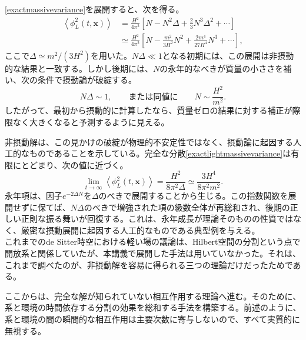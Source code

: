 \documentclass[a4paper,11pt,oneside]{article}
\theoremstyle{definition}
\numberwithin{equation}{section}
\begin{document}
\eqref{exactmassivevariance}を展開すると、次を得る。
\begin{align}
\left\langle
\phi_{L}^{2}(t,\mathbf{x})
\right\rangle
&=
\frac{H^{2}}{4\pi^{2}}
\left[
N
-
 N^{2}\Delta
+
\frac{2}{3}N^{3}\Delta^{2}
+
\cdots
\right]
\label{perturbativemassivevariance}\\
&\simeq 
\frac{H^{2}}{4\pi^{2}}
\left[
N
-
\frac{m^{2}}{3H^{2}}N^{2}
+
\frac{2m^{4}}{27H^{4}}N^{3}
+
\cdots
\right],
\end{align}
ここで\(\Delta\simeq m^{2}/(3H^{2})\)を用いた。\(
N\Delta 
\ll
1
\)となる初期には、この展開は非摂動的な結果と一致する。しかし後期には、\(N\)の永年的なべきが質量の小ささを補い、次の条件で摂動論が破綻する。
\begin{equation}
N\Delta 
\sim
1,
\qquad\text{または同値に}\qquad
N
\sim
\frac{H^{2}}{m^{2}}.
\end{equation}
したがって、最初から摂動的に計算したなら、質量ゼロの結果に対する補正が際限なく大きくなると予測するように見える。



非摂動解は、この見かけの破綻が物理的不安定性ではなく、摂動論に起因する人工的なものであることを示している。完全な分散\eqref{exactlightmassivevariance}は有限にとどまり、次の値に近づく。
\begin{equation}
\lim_{t\rightarrow\infty}
\left\langle
\phi_{L}^{2}(t,\mathbf{x})
\right\rangle
=
\frac{H^{2}}{8\pi^{2}\Delta}
\simeq
\frac{3H^{4}}{8\pi^{2}m^{2}}.
\end{equation}
永年項は、因子\(
e^{-2\Delta N}
\)を\(\Delta\)のべきで展開することから生じる。この指数関数を展開せずに保てば、\(N\Delta \)のべきで増強された項の級数全体が再総和され、後期の正しい正則な振る舞いが回復する。これは、永年成長が理論そのものの性質ではなく、厳密な摂動展開に起因する人工的なものである典型例を与える。\\



これまでのde Sitter時空における軽い場の議論は、Hilbert空間の分割という点で開放系と関係していたが、本講義で展開した手法は用いていなかった。それは、これまで調べたのが、非摂動解を容易に得られる三つの理論だけだったためである。



ここからは、完全な解が知られていない相互作用する理論へ進む。そのために、系と環境の時間依存する分割の効果を総和する手法を構築する。前述のように、系と環境の間の瞬間的な相互作用は主要次数に寄与しないので、すべて実質的に無視する。
\end{document}
